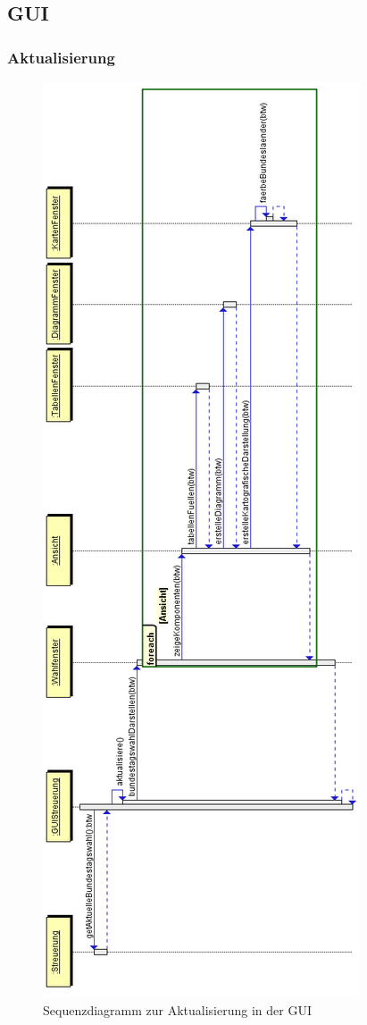 \documentclass[12pt,a4paper,titlepage]{article}
\begin{document}
\newpage
\subsection{GUI}
\subsubsection{Aktualisierung}
\begin{figure}[!ht]
\centering
\includegraphics[scale=0.5]{GUI_Aktualisierung.png} \caption{Sequenzdiagramm zur Aktualisierung in der GUI} 
\end{figure}
\end{document}
